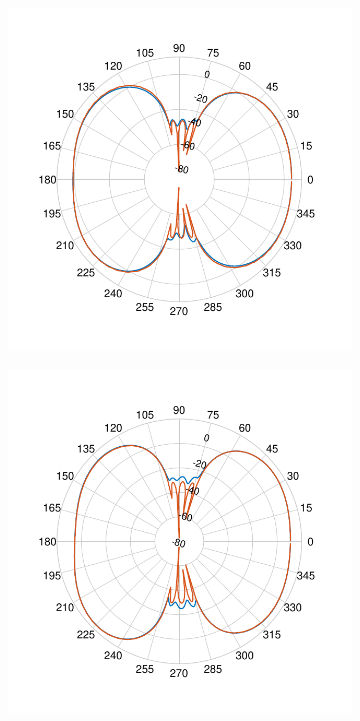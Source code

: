 \documentclass[12pt,a4paper]{article}
\begin{document}
{\begin{figure}
\begin{center}
		\begin{subfigure}{0.25\linewidth}
	\includegraphics[scale=0.5]{pcb_pifa_array_azimuth_45_comparison.pdf}
	\caption{}
\end{subfigure}
\begin{subfigure}{0.25\linewidth}
	\includegraphics[scale=0.5]{pcb_pifa_array_elevation_45_comparison.pdf}

\end{subfigure}
\end{center}
\end{figure}}
\end{document}
